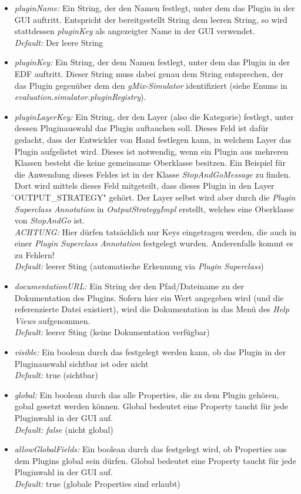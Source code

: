 \documentclass[a4paper, 11pt]{article} %
\begin{document}
\begin{itemize}
	\item \emph{pluginName:} Ein String, der den Namen festlegt, unter dem das Plugin in der GUI auftritt. Entspricht der bereitgestellt String dem leeren String, so wird stattdessen \emph{pluginKey} als angezeigter Name in der GUI verwendet.\\
	\emph{Default:} Der leere String
	\item \emph{pluginKey:} Ein String, der dem Namen festlegt, unter dem das Plugin in der EDF auftritt. Dieser String muss dabei genau dem String entsprechen, der das Plugin gegenüber dem den \emph{gMix-Simulator} identifiziert (siehe Enums in \emph{evaluation.simulator.pluginRegistry}).
	\item \emph{pluginLayerKey:} Ein String, der den Layer (also die Kategorie) festlegt, unter dessen Pluginauswahl das Plugin auftauchen soll. Dieses Feld ist dafür gedacht, dass der Entwickler von Hand festlegen kann, in welchem Layer das Plugin aufgelistet wird. Dieses ist notwendig, wenn ein Plugin aus mehreren Klassen besteht die keine gemeinsame Oberklasse besitzen. Ein Beispiel für die Anwendung dieses Feldes ist in der Klasse \emph{StopAndGoMessage} zu finden. Dort wird mittels dieses Feld mitgeteilt, dass dieses Plugin in den Layer \"{}OUTPUT\_STRATEGY" gehört. Der Layer selbst wird aber durch die \emph{Plugin Superclass Annotation} in \emph{OutputStrategyImpl} erstellt, welches eine Oberklasse von \emph{StopAndGo} ist. \\
	\emph{ACHTUNG:} Hier dürfen tatsächlich nur Keys eingetragen werden, die auch in einer \emph{Plugin Superclass Annotation} festgelegt wurden. Anderenfalls kommt es zu Fehlern!\\
	\emph{Default:} leerer Sting (automatische Erkennung via \emph{Plugin Superclass})
	\item \emph{documentationURL:}
	Ein String der den Pfad/Dateiname zu der Dokumentation des Plugins. Sofern hier ein Wert angegeben wird (und die referenzierte Datei existiert), wird die Dokumentation in das Menü des \emph{Help Views} aufgenommen.\\
	\emph{Default:} leerer Sting (keine Dokumentation verfügbar)
	\item \emph{visible:} Ein boolean durch das festgelegt werden kann, ob das Plugin in der Pluginauswahl sichtbar ist oder nicht\\
	\emph{Default:} true (sichtbar)
	\item \emph{global:} Ein boolean durch das alle Properties, die zu dem Plugin gehören, gobal gesetzt werden können. Global bedeutet eine Property taucht für jede Pluginwahl in der GUI auf.\\
	\emph{Default: false} (nicht global)
	\item \emph{allowGlobalFields:} Ein boolean durch das festgelegt wird, ob Properties aus dem Plugins global sein dürfen. Global bedeutet eine Property taucht für jede Pluginwahl in der GUI auf.\\
	\emph{Default:} true (globale Properties sind erlaubt)
\end{itemize}
\end{document}
